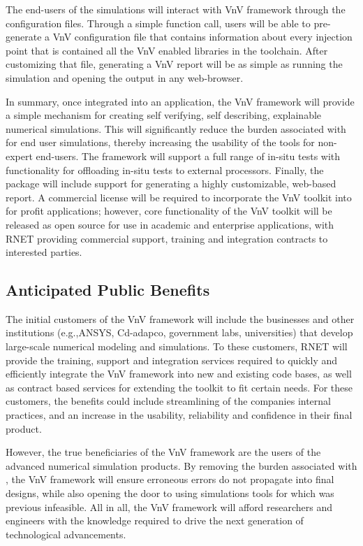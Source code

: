 The end-users of the simulations will interact with VnV framework through the configuration files. Through a simple function call, users will be able to pre-generate a VnV configuration file that contains information about every injection point that is contained all the VnV enabled 
libraries in the toolchain. After customizing that file, generating a VnV report will be as simple as running the simulation and opening the output in any web-browser.
 
In summary, once integrated into an application, the VnV framework will provide a simple mechanism for creating self verifying, self describing, explainable numerical simulations. This will significantly reduce the burden associated with \VV for end user simulations, thereby increasing the usability of the tools for non-expert end-users. The framework will support a full range of in-situ \VV tests with functionality for offloading in-situ tests to external processors. Finally, the package will include support for generating a highly customizable, web-based \VV report. A commercial license will be required to incorporate the VnV toolkit into for profit applications; however, core functionality of the VnV toolkit will be released as open source for use in academic and enterprise applications, with RNET providing commercial support, training and integration contracts to interested parties. 


\subsection{Anticipated Public Benefits}

The initial customers of the VnV framework will include the businesses and other institutions (e.g.,ANSYS, Cd-adapco, government labs, universities) that develop large-scale numerical modeling and simulations. To these customers, RNET will provide the training, support and integration services required to quickly and efficiently integrate the VnV framework into new and existing code bases, as well as contract based services for extending the toolkit to fit certain needs. For these customers, the benefits could include streamlining of the companies internal \VV practices, and an increase in the usability, reliability and confidence in their final product.

However, the true beneficiaries of the VnV framework are the users of the advanced numerical simulation products. By removing the burden associated with \VV, the VnV framework will ensure erroneous errors do not propagate into final designs, while also opening the door to using simulations tools for which \VV was previous infeasible. All in all, the VnV framework will afford researchers and engineers with the knowledge required to drive the next generation of technological advancements. 


